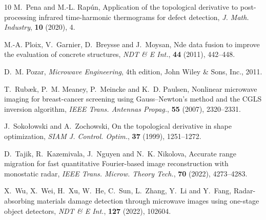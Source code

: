 \documentclass[a4,10pt]{article}
\theoremstyle{plain}
\theoremstyle{remark}
\begin{document}
\begin{thebibliography}{10}
\newblock M.~Pena and M.-L. Rap{\'u}n,
\newblock Application of the topological derivative to post-processing infrared
  time-harmonic thermograms for defect detection,
\newblock \emph{J. Math. Industry}, \textbf{10} (2020), 4.

\newblock M.-A. Ploix, V.~Garnier, D.~Breysse and J.~Moysan,
\newblock Nde data fusion to improve the evaluation of concrete structures,
\newblock \emph{NDT \& E Int.}, \textbf{44} (2011), 442--448.

\newblock D.~M. Pozar,
\newblock \emph{Microwave Engineering},
\newblock 4th edition,
\newblock John Wiley \& Sons, Inc., 2011.

\newblock T.~Rub{\ae}k, P.~M. Meaney, P.~Meincke and K.~D. Paulsen,
\newblock Nonlinear microwave imaging for breast-cancer screening using
  {G}auss--{N}ewton's method and the {CGLS} inversion algorithm,
\newblock \emph{IEEE Trans. Antennas Propag.}, \textbf{55} (2007), 2320--2331.

\newblock J.~Soko{\l}owski and A.~Zochowski,
\newblock On the topological derivative in shape optimization,
\newblock \emph{SIAM J. Control. Optim.}, \textbf{37} (1999), 1251--1272.

\newblock D.~Tajik, R.~Kazemivala, J.~Nguyen and N.~K. Nikolova,
\newblock Accurate range migration for fast quantitative {F}ourier-based image
  reconstruction with monostatic radar,
\newblock \emph{IEEE Trans. Microw. Theory Tech.}, \textbf{70} (2022),
  4273--4283.

\newblock X.~Wu, X.~Wei, H.~Xu, W.~He, C.~Sun, L.~Zhang, Y.~Li and Y.~Fang,
\newblock Radar-absorbing materials damage detection through microwave images
  using one-stage object detectors,
\newblock \emph{NDT \& E Int.}, \textbf{127} (2022), 102604.

\end{thebibliography}
\end{document}

